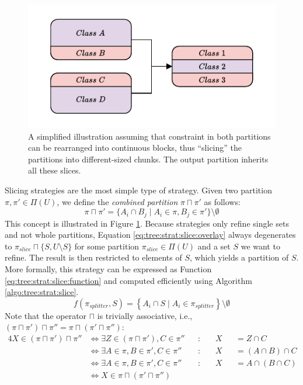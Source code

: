 			\begin{figure}[ht!]
				\centering
				\includegraphics[scale=1.2]{Bilder/DrawIO/strat_slicing_pdf}
				\caption{A simplified illustration assuming that constraint in both partitions can be rearranged into continuous blocks, thus \enquote{slicing} the partitions into different-sized chunks. The output partition inherits all these slices.}
				\label{fig:tree:strat:slice}
			\end{figure}
		
			Slicing strategies are the most simple type of strategy.
			Given two partition $\pi, \pi' \in \Pi(U)$, we define the \textit{combined partition} $\pi \sqcap \pi'$ as follows:
			\begin{equation}
				\label{eq:tree:strat:slice:overlay}
				\pi \sqcap \pi' = \{ A_i \cap B_j \mid A_i \in \pi, B_j \in \pi' \} \setminus \emptyset
			\end{equation}
			This concept is illustrated in Figure \ref{fig:tree:strat:slice}.
			Because strategies only refine single sets and not whole partitions, Equation \ref{eq:tree:strat:slice:overlay} always degenerates to $\pi_{slice} \sqcap \{ S, U \setminus S \}$ for some partition $\pi_{slice} \in \Pi(U)$ and a set $S$ we want to refine.
			The result is then restricted to elements of $S$, which yields a partition of $S$.
			More formally, this strategy can be expressed as Function \ref{eq:tree:strat:slice:function} and computed efficiently using Algorithm \ref{algo:tree:strat:slice}.
			\begin{equation}
			\label{eq:tree:strat:slice:function}
				f(\pi_{splitter}, S) = \left\{ A_i \cap S \mid A_i \in \pi_{splitter} \right\} \setminus \emptyset
			\end{equation}
			Note that the operator $\sqcap$ is trivially associative, i.e., $(\pi \sqcap \pi') \sqcap \pi'' = \pi \sqcap (\pi' \sqcap \pi'')$:
			\begin{alignat*}{4}
				X \in (\pi \sqcap \pi') \sqcap \pi'' &\iff \exists Z \in (\pi \sqcap \pi'), C \in \pi'' && : \; && X && ={} Z \cap C \\
				&\iff \exists A \in \pi, B \in \pi', C \in \pi''&& : \; && X && ={} (A \cap B) \cap C \\
				&\iff \exists A \in \pi, B \in \pi', C \in \pi''&& : \; && X && ={} A \cap (B \cap C) \\
				&\iff  X \in \pi \sqcap (\pi' \sqcap \pi'')
			\end{alignat*}
			
